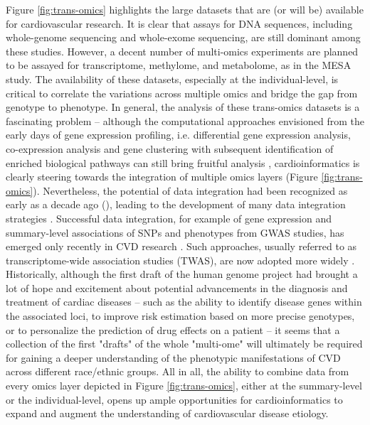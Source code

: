 \documentclass[letter]{bioinfo}
\begin{document}
	 Figure \ref{fig:trans-omics} highlights the large datasets that are (or will be) available for cardiovascular research. It is clear that assays for DNA sequences, including whole-genome sequencing and whole-exome sequencing, are still dominant among these studies. However, a decent number of multi-omics experiments are planned to be assayed for transcriptome, methylome, and metabolome, as in the MESA study. The availability of these datasets, especially at the individual-level, is critical to correlate the variations across multiple omics and bridge the gap from genotype to phenotype.  In general, the analysis of these trans-omics datasets is a fascinating problem -- although the computational approaches envisioned from the early days of gene expression profiling, i.e. differential gene expression analysis, co-expression analysis and gene clustering with subsequent identification of enriched biological pathways \citep{Claverie:1999:Computational} can still bring fruitful analysis \citep{Santolini:2018:personalized}, cardioinformatics is clearly steering towards the integration of multiple omics layers (Figure \ref{fig:trans-omics}). Nevertheless, the potential of data integration had been recognized as early as a decade ago (\cite{Hawkins:2010:Nextgeneration}), leading to the development of many data integration strategies \citep{Ritchie:2015:Methods}. Successful data integration, for example of gene expression and summary-level associations of SNPs and phenotypes from GWAS studies, has emerged only recently in CVD research \citep{Gusev:2016:Integrative}. Such approaches, usually referred to as transcriptome-wide association studies (TWAS), are now adopted more widely \citep{Klarin:2018:Genetics}.  Historically, although the first draft of the human genome project had brought a lot of hope and excitement about potential advancements in the diagnosis and treatment of cardiac diseases -- such as the ability to identify disease genes within the associated loci, to improve risk estimation based on more precise genotypes, or to personalize the prediction of drug effects on a patient \citep{Komajda:2001:heart} -- it seems that a collection of the first "drafts" of the whole "multi-ome" will ultimately be required for gaining a deeper understanding of the phenotypic manifestations of CVD across different race/ethnic groups.  All in all, the ability to combine data from every omics layer depicted in Figure \ref{fig:trans-omics}, either at the summary-level or the individual-level, opens up ample opportunities for cardioinformatics to expand and augment the understanding of cardiovascular disease etiology.
	
\end{document}
